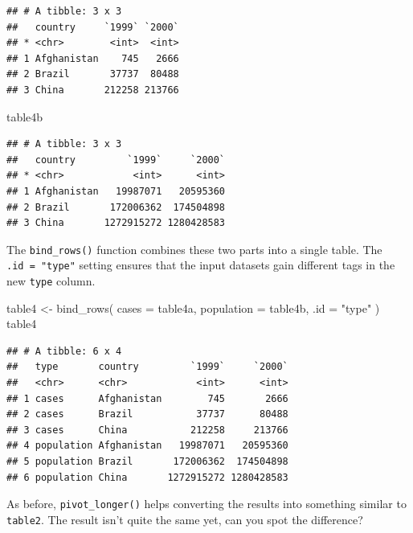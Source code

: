 \documentclass[]{book}
\newenvironment{Shaded}{}{}
\newcommand{\DataTypeTok}[1]{#1}
\newcommand{\KeywordTok}[1]{\textcolor[rgb]{0.00,0.00,1.00}{#1}}
\newcommand{\NormalTok}[1]{#1}
\newcommand{\OperatorTok}[1]{#1}
\newcommand{\StringTok}[1]{\textcolor[rgb]{0.00,0.50,0.50}{#1}}
\begin{document}
\begin{verbatim}
## # A tibble: 3 x 3
##   country     `1999` `2000`
## * <chr>        <int>  <int>
## 1 Afghanistan    745   2666
## 2 Brazil       37737  80488
## 3 China       212258 213766
\end{verbatim}

\begin{Shaded}
\begin{Highlighting}[]
\NormalTok{table4b}
\end{Highlighting}
\end{Shaded}

\begin{verbatim}
## # A tibble: 3 x 3
##   country         `1999`     `2000`
## * <chr>            <int>      <int>
## 1 Afghanistan   19987071   20595360
## 2 Brazil       172006362  174504898
## 3 China       1272915272 1280428583
\end{verbatim}

The \texttt{bind\_rows()} function combines these two parts into a single table.
The \texttt{.id\ =\ "type"} setting ensures that the input datasets gain different tags in the new \texttt{type} column.

\begin{Shaded}
\begin{Highlighting}[]
\NormalTok{table4 <-}
\StringTok{  }\KeywordTok{bind_rows}\NormalTok{(}
    \DataTypeTok{cases =}\NormalTok{ table4a,}
    \DataTypeTok{population =}\NormalTok{ table4b,}
    \DataTypeTok{.id =} \StringTok{"type"}
\NormalTok{  )}
\NormalTok{table4}
\end{Highlighting}
\end{Shaded}

\begin{verbatim}
## # A tibble: 6 x 4
##   type       country         `1999`     `2000`
##   <chr>      <chr>            <int>      <int>
## 1 cases      Afghanistan        745       2666
## 2 cases      Brazil           37737      80488
## 3 cases      China           212258     213766
## 4 population Afghanistan   19987071   20595360
## 5 population Brazil       172006362  174504898
## 6 population China       1272915272 1280428583
\end{verbatim}

As before, \texttt{pivot\_longer()} helps converting the results into something similar to \texttt{table2}.
The result isn't quite the same yet, can you spot the difference?

\begin{Shaded}
\end{Shaded}
\end{document}
